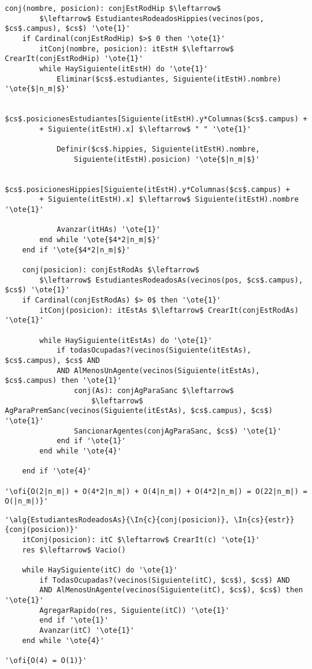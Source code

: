 \begin{lstlisting}[mathescape]
	conj(nombre, posicion): conjEstRodHip $\leftarrow$
		$\leftarrow$ EstudiantesRodeadosHippies(vecinos(pos, $cs$.campus), $cs$) '\ote{1}'
	if Cardinal(conjEstRodHip) $>$ 0 then '\ote{1}'
		itConj(nombre, posicion): itEstH $\leftarrow$ CrearIt(conjEstRodHip) '\ote{1}'
		while HaySiguiente(itEstH) do '\ote{1}'
			Eliminar($cs$.estudiantes, Siguiente(itEstH).nombre) '\ote{$|n_m|$}'

			$cs$.posicionesEstudiantes[Siguiente(itEstH).y*Columnas($cs$.campus) +
		+ Siguiente(itEstH).x] $\leftarrow$ " " '\ote{1}'

			Definir($cs$.hippies, Siguiente(itEstH).nombre,
				Siguiente(itEstH).posicion) '\ote{$|n_m|$}'

			$cs$.posicionesHippies[Siguiente(itEstH).y*Columnas($cs$.campus) +
		+ Siguiente(itEstH).x] $\leftarrow$ Siguiente(itEstH).nombre '\ote{1}'

			Avanzar(itHAs) '\ote{1}'
		end while '\ote{$4*2|n_m|$}'
	end if '\ote{$4*2|n_m|$}'

	conj(posicion): conjEstRodAs $\leftarrow$
		$\leftarrow$ EstudiantesRodeadosAs(vecinos(pos, $cs$.campus), $cs$) '\ote{1}'
	if Cardinal(conjEstRodAs) $> 0$ then '\ote{1}'
		itConj(posicion): itEstAs $\leftarrow$ CrearIt(conjEstRodAs) '\ote{1}'

		while HaySiguiente(itEstAs) do '\ote{1}'
			if todasOcupadas?(vecinos(Siguiente(itEstAs), $cs$.campus), $cs$ AND
			AND AlMenosUnAgente(vecinos(Siguiente(itEstAs), $cs$.campus) then '\ote{1}'
				conj(As): conjAgParaSanc $\leftarrow$
					$\leftarrow$ AgParaPremSanc(vecinos(Siguiente(itEstAs), $cs$.campus), $cs$) '\ote{1}'
				SancionarAgentes(conjAgParaSanc, $cs$) '\ote{1}'
			end if '\ote{1}'
		end while '\ote{4}'

	end if '\ote{4}'

'\ofi{O(2|n_m|) + O(4*2|n_m|) + O(4|n_m|) + O(4*2|n_m|) = O(22|n_m|) = O(|n_m|)}'
\end{lstlisting}

\begin{lstlisting}[mathescape]
'\alg{EstudiantesRodeadosAs}{\In{c}{conj(posicion)}, \In{cs}{estr}}{conj(posicion)}'
	itConj(posicion): itC $\leftarrow$ CrearIt(c) '\ote{1}'
	res $\leftarrow$ Vacio()

	while HaySiguiente(itC) do '\ote{1}'
		if TodasOcupadas?(vecinos(Siguiente(itC), $cs$), $cs$) AND
		AND AlMenosUnAgente(vecinos(Siguiente(itC), $cs$), $cs$) then '\ote{1}'
		AgregarRapido(res, Siguiente(itC)) '\ote{1}'
		end if '\ote{1}'
		Avanzar(itC) '\ote{1}'
	end while '\ote{4}'

'\ofi{O(4) = O(1)}'
\end{lstlisting}

